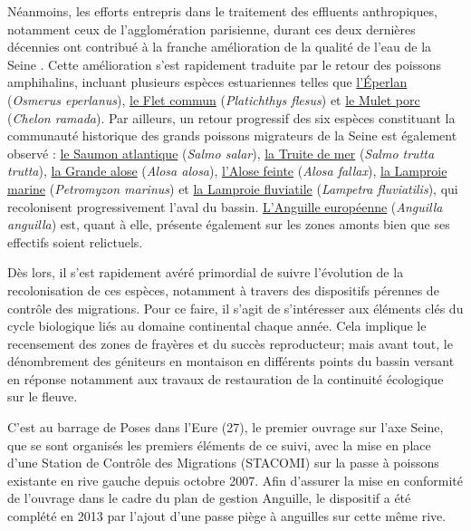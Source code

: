 \documentclass[11pt,twoside]{article}\usepackage[]{graphicx}\usepackage[table]{xcolor}
\begin{document}
Néanmoins, les efforts entrepris dans le traitement des effluents anthropiques, notamment ceux de l'agglomération parisienne, durant ces deux dernières décennies ont contribué à la franche amélioration de la qualité de l'eau de la Seine \citep{billen_programme_1999,belliard_return_2009,
gousailles_limpact_2009}.
Cette amélioration s’est rapidement traduite par le retour des poissons amphihalins, incluant plusieurs espèces estuariennes telles que \href{https://seinormigr.fr/fr/petits-migrateurs-d332}{l’Éperlan} (\textit{Osmerus eperlanus}), \href{https://seinormigr.fr/fr/petits-migrateurs-d332}{le Flet commun} (\textit{Platichthys flesus}) et \href{https://seinormigr.fr/fr/petits-migrateurs-d332}{le Mulet porc} (\textit{Chelon ramada}). Par ailleurs, un retour progressif des six espèces constituant la communauté historique des grands poissons migrateurs de la Seine est également observé \citep{rochard_identification_2009, duhamel_peuplement_2004} : \href{https://seinormigr.fr/fr/saumon-atlantique-7036}{le Saumon atlantique} (\textit{Salmo salar}), \href{https://seinormigr.fr/fr/truite-de-mer-e71d}{la Truite de mer} (\textit{Salmo trutta trutta}), \href{https://seinormigr.fr/fr/grande-alose-0d85}{la Grande alose} (\textit{Alosa alosa}), \href{https://seinormigr.fr/fr/l-alose-feinte-9df4}{l'Alose feinte} (\textit{Alosa fallax}), \href{https://seinormigr.fr/fr/lamproie-marine-a53d}{la Lamproie marine} (\textit{Petromyzon marinus}) et \href{https://seinormigr.fr/fr/lamproie-fluviatile-faf3}{la Lamproie fluviatile} (\textit{Lampetra fluviatilis}), qui recolonisent progressivement l'aval du bassin.
\href{https://seinormigr.fr/fr/l-anguille-europeenne-6bca}{L'Anguille européenne} (\textit{Anguilla anguilla}) est, quant à elle, présente également sur les zones amonts bien que ses effectifs soient relictuels.

Dès lors, il s'est rapidement avéré primordial de suivre l'évolution de la recolonisation de ces espèces, notamment à travers des dispositifs pérennes de contrôle des migrations. Pour ce faire, il s'agit de s'intéresser aux éléments clés du cycle biologique liés au domaine continental chaque année. Cela implique
le recensement des zones de frayères et du succès reproducteur; mais avant tout, le dénombrement des géniteurs en montaison en différents points du bassin versant en réponse notamment aux travaux de restauration de la continuité écologique sur le fleuve.

C'est au barrage de Poses dans l'Eure (27), le premier ouvrage sur l'axe Seine, que se sont organisés les premiers éléments de ce suivi, avec la mise en place d'une Station de Contrôle des Migrations (STACOMI) sur la passe à poissons existante en rive gauche depuis octobre 2007. Afin d'assurer la mise en conformité de l'ouvrage dans le cadre du plan de gestion Anguille, le dispositif a été complété en 2013 par l'ajout d'une passe piège à anguilles sur cette même rive.
\end{document}
